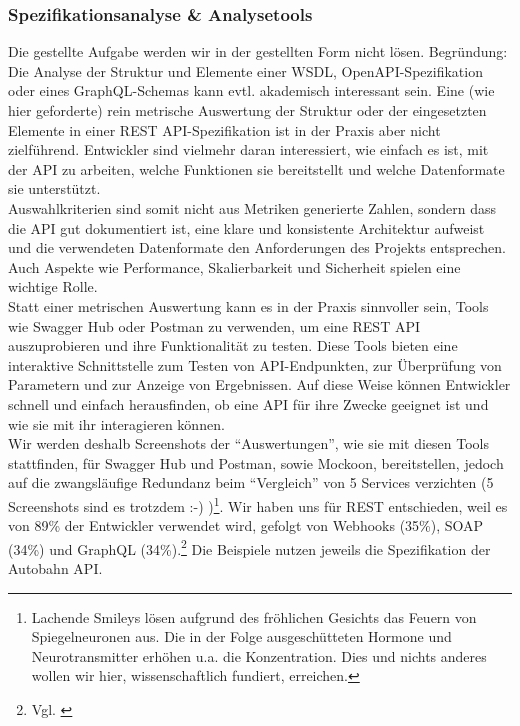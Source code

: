 \documentclass[notitlepage, hidelinks]{article}
\begin{document}
\subsubsection{Spezifikationsanalyse \& Analysetools}

Die gestellte Aufgabe werden wir in der gestellten Form nicht lösen. Begründung: Die Analyse der Struktur und Elemente einer WSDL, OpenAPI-Spezifikation oder eines GraphQL-Schemas kann evtl. akademisch interessant sein. Eine (wie hier geforderte) rein metrische Auswertung der Struktur oder der eingesetzten Elemente in einer REST API-Spezifikation ist in der Praxis aber nicht zielführend. Entwickler sind vielmehr daran interessiert, wie einfach es ist, mit der API zu arbeiten, welche Funktionen sie bereitstellt und welche Datenformate sie unterstützt. \\
Auswahlkriterien sind somit nicht aus Metriken generierte Zahlen, sondern dass die API gut dokumentiert ist, eine klare und konsistente Architektur aufweist und die verwendeten Datenformate den Anforderungen des Projekts entsprechen. Auch Aspekte wie Performance, Skalierbarkeit und Sicherheit spielen eine wichtige Rolle. \\
Statt einer metrischen Auswertung kann es in der Praxis sinnvoller sein, Tools wie Swagger Hub oder Postman zu verwenden, um eine REST API auszuprobieren und ihre Funktionalität zu testen. Diese Tools bieten eine interaktive Schnittstelle zum Testen von API-Endpunkten, zur Überprüfung von Parametern und zur Anzeige von Ergebnissen. Auf diese Weise können Entwickler schnell und einfach herausfinden, ob eine API für ihre Zwecke geeignet ist und wie sie mit ihr interagieren können. \\
Wir werden deshalb Screenshots der ``Auswertungen'', wie sie mit diesen Tools stattfinden, für Swagger Hub und Postman, sowie Mockoon, bereitstellen, jedoch auf die zwangsläufige Redundanz beim ``Vergleich'' von 5 Services verzichten (5 Screenshots sind es trotzdem :-) )\footnote{Lachende Smileys lösen aufgrund des fröhlichen Gesichts das Feuern von Spiegelneuronen aus. Die in der Folge ausgeschütteten Hormone und Neurotransmitter erhöhen u.a. die Konzentration. Dies und nichts anderes wollen wir hier, wissenschaftlich fundiert, erreichen.\cite{wiki-spiegel}}. Wir haben uns für REST entschieden, weil es von 89\% der Entwickler verwendet wird, gefolgt von Webhooks (35\%), SOAP (34\%) und GraphQL (34\%).\footnote{Vgl. \cite{api-postman}} Die Beispiele nutzen jeweils die Spezifikation der Autobahn API.
\end{document}
